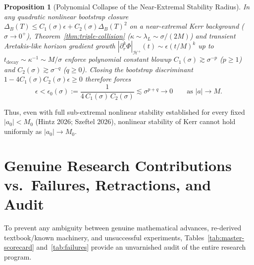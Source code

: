 \documentclass[11pt, a4paper]{article}
\newtheorem{proposition}[theorem]{Proposition}
\theoremstyle{remark}
\begin{document}
\begin{proposition}[Polynomial Collapse of the Near-Extremal Stability Radius]
\label{prop:eps-collapse}
In any quadratic nonlinear bootstrap closure $\Delta_B(T) \le C_1(\sigma)\epsilon + C_2(\sigma)\Delta_B(T)^2$ on a near-extremal Kerr background ($\sigma \to 0^+$), Theorem~\ref{thm:triple-collision} ($\kappa \sim \lambda_L \sim \sigma/(2M)$) and transient Aretakis-like horizon gradient growth $|\partial_r^k\Phi|_{\mathcal{H}^+}(t) \sim \epsilon(t/M)^k$ up to $t_{\mathrm{decay}} \sim \kappa^{-1} \sim M/\sigma$ enforce polynomial constant blowup $C_1(\sigma) \gtrsim \sigma^{-p}$ ($p \ge 1$) and $C_2(\sigma) \gtrsim \sigma^{-q}$ ($q \ge 0$). Closing the bootstrap discriminant $1 - 4C_1(\sigma)C_2(\sigma)\epsilon \ge 0$ therefore forces
\begin{equation}
\epsilon < \epsilon_0(\sigma) := \frac{1}{4\,C_1(\sigma)\,C_2(\sigma)} \lesssim \sigma^{p + q} \longrightarrow 0 \qquad \text{as } |a| \to M.
\end{equation}
\end{proposition}

Thus, even with full sub-extremal nonlinear stability established for every fixed $|a_0| < M_0$ (Hintz 2026; Szeftel 2026), nonlinear stability of Kerr cannot hold uniformly as $|a_0| \to M_0$.

\section{Genuine Research Contributions vs.\ Failures, Retractions, and Audit}
\label{sec:audit}

To prevent any ambiguity between genuine mathematical advances, re-derived textbook/known machinery, and unsuccessful experiments, Tables~\ref{tab:master-scorecard} and~\ref{tab:failures} provide an unvarnished audit of the entire research program.
\end{document}

